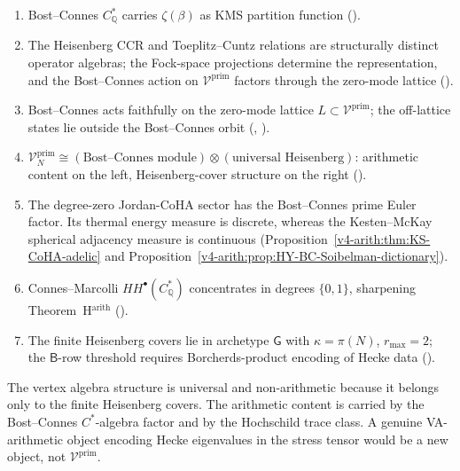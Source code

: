 \begin{enumerate}
\item Bost--Connes \(C^{*}_{\mathbb{Q}}\) carries \(\zeta(\beta)\) as
KMS partition function ().
\item The Heisenberg CCR and Toeplitz--Cuntz relations are
structurally distinct operator algebras; the Fock-space
projections determine the representation, and the Bost--Connes
action on \(\mathcal{V}^{\mathrm{prim}}\) factors through the
zero-mode lattice ().
\item Bost--Connes acts faithfully on the zero-mode lattice
\(L \subset \mathcal{V}^{\mathrm{prim}}\); the off-lattice states
lie outside the Bost--Connes orbit
(,
).
\item \(\mathcal{V}^{\mathrm{prim}}_{N} \cong
(\text{Bost--Connes module}) \otimes (\text{universal Heisenberg})\):
arithmetic content on the left, Heisenberg-cover structure on the right
().
\item The degree-zero Jordan-CoHA sector has the Bost--Connes
prime Euler factor. Its thermal energy measure is discrete, whereas
the Kesten--McKay spherical adjacency measure is continuous
(Proposition~\ref{v4-arith:thm:KS-CoHA-adelic} and
Proposition~\ref{v4-arith:prop:HY-BC-Soibelman-dictionary}).
\item Connes--Marcolli \(HH^{\bullet}(C_{\mathbb{Q}}^{*})\) concentrates
in degrees \(\{0,1\}\), sharpening Theorem~H\(^{\mathrm{arith}}\)
().
\item The finite Heisenberg covers lie in archetype \(\mathsf{G}\)
with \(\kappa=\pi(N)\), \(r_{\max}=2\); the \(\mathsf{B}\)-row threshold
requires Borcherds-product encoding of Hecke data
().
\end{enumerate}

The vertex algebra structure is universal and non-arithmetic because
it belongs only to the finite Heisenberg covers. The arithmetic content
is carried by the Bost--Connes \(C^{*}\)-algebra factor and by the
Hochschild trace class. A genuine VA-arithmetic object encoding Hecke
eigenvalues in the stress tensor would be a new object, not
\(\mathcal{V}^{\mathrm{prim}}\).
